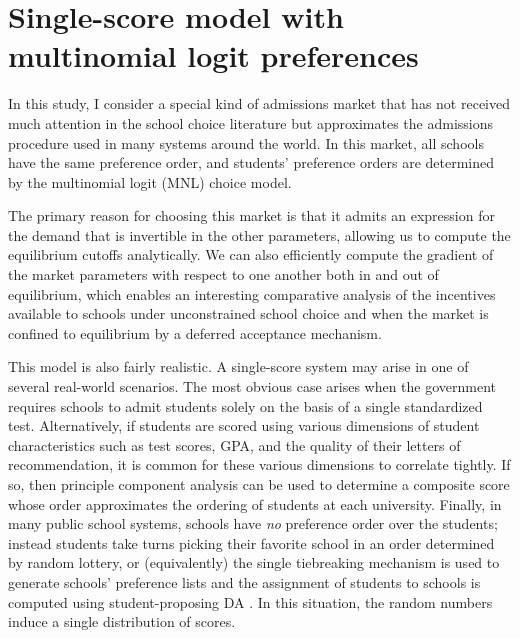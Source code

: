 \documentclass[12pt]{article}
\theoremstyle{definition}
\begin{document}
\pagebreak

\section{Single-score model with multinomial logit preferences} \label{singlescoremodel}
In this study, I consider a special kind of admissions market that has not received much attention in the school choice literature but approximates the admissions procedure used in many systems around the world. In this market, all schools have the same preference order, and students' preference orders are determined by the multinomial logit (MNL) choice model.

The primary reason for choosing this market is that it admits an expression for the demand that is invertible in the other parameters, allowing us to compute the equilibrium cutoffs analytically. We can also efficiently compute the gradient of the market parameters with respect to one another both in and out of equilibrium, which enables an interesting comparative analysis of the incentives available to schools under unconstrained school choice and when the market is confined to equilibrium by a deferred acceptance mechanism.

This model is also fairly realistic. A single-score system may arise in one of several real-world scenarios. The most obvious case arises when the government requires schools to admit students solely on the basis of a single standardized test. Alternatively, if students are scored using various dimensions of student characteristics such as test scores, GPA, and the quality of their letters of recommendation, it is common for these various dimensions to correlate tightly. If so, then principle component analysis can be used to determine a composite score whose order approximates the ordering of students at each university. Finally, in many public school systems, schools have \emph{no} preference order over the students; instead students take turns picking their favorite school in an order determined by random lottery, or (equivalently) the single tiebreaking mechanism is used to generate schools’ preference lists and the assignment of students to schools is computed using student-proposing DA \parencite[][]{whatmatters}. In this situation, the random numbers induce a single distribution of scores.
\end{document}
